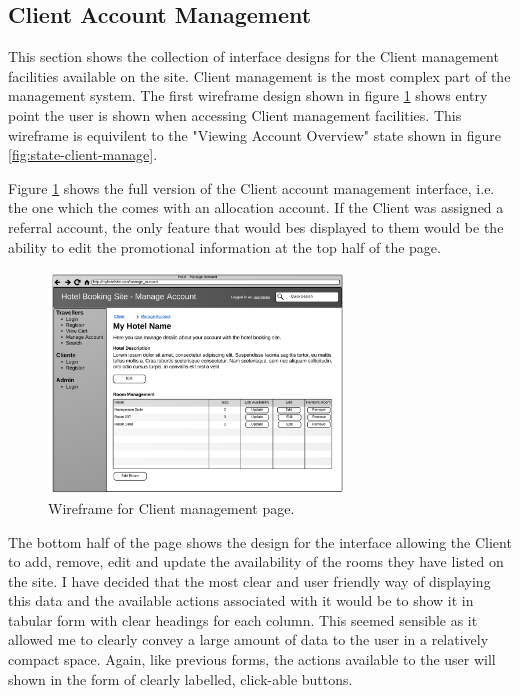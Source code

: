 \documentclass{article}
\begin{document}
\subsection{Client Account Management}
This section shows the collection of interface designs for the Client management facilities available on the site. Client management is the most complex part of the management system. The first wireframe design shown in figure \ref{fig:wireframe-client-management} shows entry point the user is shown when accessing Client management facilities. This wireframe is equivilent to the "Viewing Account Overview" state shown in figure \ref{fig:state-client-manage}.

Figure \ref{fig:wireframe-client-management} shows the full version of the Client account management interface, i.e. the one which the comes with an allocation account. If the Client was assigned a referral account, the only feature that would bes displayed to them would be the ability to edit the promotional information at the top half of the page.
 
\begin{figure}[H]
\centering
\includegraphics[width=0.7\textwidth]{img/wireframes/ClientManagement.png}
\caption{Wireframe for Client management page.}
\label{fig:wireframe-client-management}
\end{figure}

The bottom half of the page shows the design for the interface allowing the Client to add, remove, edit and update the availability of the rooms they have listed on the site. I have decided that the most clear and user friendly way of displaying this data and the available actions associated with it would be to show it in tabular form with clear headings for each column. This seemed sensible as it allowed me to clearly convey a large amount of data to the user in a relatively compact space. Again, like previous forms, the actions available to the user will shown in the form of clearly labelled, click-able buttons.
\end{document}
